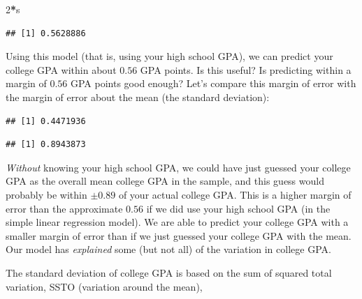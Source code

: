 \documentclass[]{book}
\newenvironment{Shaded}{\begin{snugshade}}{\end{snugshade}}
\newcommand{\DecValTok}[1]{\textcolor[rgb]{0.00,0.00,0.81}{#1}}
\newcommand{\KeywordTok}[1]{\textcolor[rgb]{0.13,0.29,0.53}{\textbf{#1}}}
\newcommand{\NormalTok}[1]{#1}
\newcommand{\OperatorTok}[1]{\textcolor[rgb]{0.81,0.36,0.00}{\textbf{#1}}}
\begin{document}
\begin{Shaded}
\begin{Highlighting}[]
\DecValTok{2}\OperatorTok{*}\NormalTok{s}
\end{Highlighting}
\end{Shaded}

\begin{verbatim}
## [1] 0.5628886
\end{verbatim}

Using this model (that is, using your high school GPA), we can predict your college GPA within about \(0.56\) GPA points. Is this useful? Is predicting within a margin of \(0.56\) GPA points good enough? Let's compare this margin of error with the margin of error about the mean (the standard deviation):

\begin{Shaded}
\end{Shaded}

\begin{verbatim}
## [1] 0.4471936
\end{verbatim}

\begin{Shaded}
\end{Shaded}

\begin{verbatim}
## [1] 0.8943873
\end{verbatim}

\emph{Without} knowing your high school GPA, we could have just guessed your college GPA as the overall mean college GPA in the sample, and this guess would probably be within \(\pm 0.89\) of your actual college GPA. This is a higher margin of error than the approximate \(0.56\) if we did use your high school GPA (in the simple linear regression model). We are able to predict your college GPA with a smaller margin of error than if we just guessed your college GPA with the mean. Our model has \emph{explained} some (but not all) of the variation in college GPA.

The standard deviation of college GPA is based on the sum of squared total variation, SSTO (variation around the mean),
\end{document}

